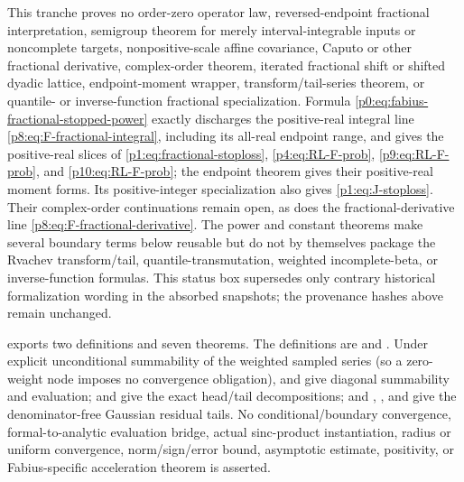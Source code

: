 \documentclass[11pt,oneside]{article}
\theoremstyle{definition}
\theoremstyle{remark}
\newcommand{\1}{\mathbf 1}
\begin{document}
\begin{statusbox}
This tranche proves no order-zero operator law, reversed-endpoint fractional
interpretation, semigroup theorem for merely interval-integrable inputs or noncomplete
targets, nonpositive-scale affine covariance, Caputo or other fractional derivative,
complex-order theorem, iterated fractional shift or shifted dyadic lattice, endpoint-moment
wrapper, transform/tail-series theorem, or quantile- or inverse-function fractional
specialization.  Formula
\eqref{p0:eq:fabius-fractional-stopped-power} exactly discharges the positive-real integral
line \eqref{p8:eq:F-fractional-integral}, including its all-real endpoint range, and gives
the positive-real slices of \eqref{p1:eq:fractional-stoploss},
\eqref{p4:eq:RL-F-prob}, \eqref{p9:eq:RL-F-prob}, and
\eqref{p10:eq:RL-F-prob}; the endpoint theorem gives their positive-real moment forms.
Its positive-integer specialization also gives \eqref{p1:eq:J-stoploss}.
Their complex-order continuations remain open, as does the fractional-derivative line
\eqref{p8:eq:F-fractional-derivative}.  The power and constant theorems make several
boundary terms below reusable but do not by themselves package the Rvachev transform/tail,
quantile-transmutation, weighted incomplete-beta, or inverse-function formulas.  This status box
supersedes only contrary historical formalization wording in the absorbed snapshots; the
provenance hashes above remain unchanged.
\end{statusbox}
\begin{statusbox}
 exports two definitions and seven theorems.  The definitions
are  and
.  Under explicit unconditional summability of
the weighted sampled series (so a zero-weight node imposes no convergence obligation),
 and
 give diagonal summability and evaluation;
 and
 give the exact
head/tail decompositions; and
,
, and
 give the denominator-free
Gaussian residual tails.  No conditional/boundary convergence, formal-to-analytic
 evaluation bridge, actual sinc-product instantiation, radius or uniform
convergence, norm/sign/error bound, asymptotic estimate, positivity, or Fabius-specific
acceleration theorem is asserted.
\end{statusbox}
\end{document}
